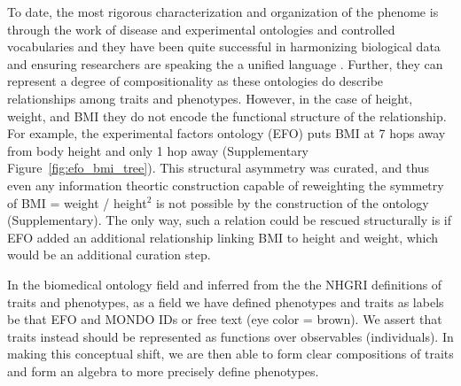 To date, the most rigorous characterization and organization of the phenome is through the work of disease and experimental ontologies and controlled vocabularies \cite{efo_malone2010,mondo2026,hpo2024,ordo2014} and they have been quite successful in harmonizing biological data \cite{gwascatalog2023} and ensuring researchers are speaking the a unified language \cite{obofoundry2007}. Further, they can represent a degree of compositionality as these ontologies do describe relationships among traits and phenotypes. However, in the case of height, weight, and BMI they do not encode the functional structure of the relationship. For example, the experimental factors ontology (EFO) \cite{efo_malone2010} puts BMI at 7 hops away from body height and only 1 hop away (Supplementary Figure~\ref{fig:efo_bmi_tree}). This structural asymmetry was curated, and thus even any information theortic construction capable of reweighting the symmetry of BMI = weight / height$^2$ is not possible by the construction of the ontology (Supplementary). The only way, such a relation could be rescued structurally is if EFO added an additional relationship linking BMI to height and weight, which would be an additional curation step.

In the biomedical ontology field and inferred from the the NHGRI definitions of traits and phenotypes, as a field we have defined phenotypes and traits as labels be that EFO and MONDO IDs or free text (eye color = brown). We assert that traits instead should be represented as functions over observables (individuals). In making this conceptual shift, we are then able to form clear compositions of traits and form an algebra to more precisely define phenotypes.

